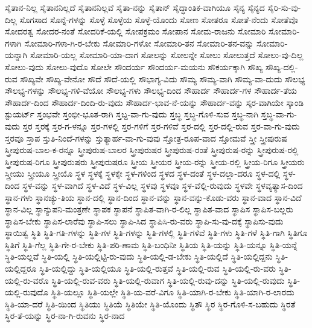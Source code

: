 {ಸೈತಾನ-ನಿಲ್ಲ
ಸೈತಾನನಿಲ್ಲದೆ
ಸೈತಾನನಿಲ್ಲವೆ
ಸೈತಾ-ನನ್ನು
ಸೈತಾನ್
ಸೈದ್ಧಾಂತಿಕ-ವಾಗಿಯೂ
ಸೈನ್ಯ
ಸೈನ್ಯದ
ಸೈರಿ-ಸು-ವು-ದಿಲ್ಲ
ಸೊಗಸಾದ
ಸೊನ್ನೆ-ಗಳನ್ನು
ಸೊಳ್ಳೆ
ಸೊಳ್ಳೆಯ
ಸೊಳ್ಳೆ-ಯೊಂದು
ಸೋಣ
ಸೋತರೂ
ಸೋತೆ-ನೆಂದು
ಸೋತೆವೊ
ಸೋದರತ್ವ
ಸೋದರ-ನಂತೆ
ಸೋದರಿಕೆ-ಯಲ್ಲಿ
ಸೋಪಕ್ರಮಂ
ಸೋಪಾನ
ಸೋಮ-ರಾಜನು
ಸೋಮಾರಿ
ಸೋಮಾರಿ-ಗಳಾಗಿ
ಸೋಮಾರಿ-ಗಳಾ-ಗಿ-ರ-ಬೇಕು
ಸೋಮಾರಿ-ಗಳೋ
ಸೋಮಾರಿ-ತನ
ಸೋಮಾರಿ-ತನ-ವನ್ನು
ಸೋಮಾರಿ-ಯನ್ನಾಗಿ
ಸೋಮಾರಿ-ಯಲ್ಲ
ಸೋಮಾರಿ-ಯಾ-ದಾಗ
ಸೋಲನ್ನು
ಸೋಲನ್ನೇ
ಸೋಲು
ಸೋಲುತ್ತದೆ
ಸೋಲು-ವು-ದಿಲ್ಲ
ಸೋಲು-ವುದು
ಸೋಲು-ವುದೊ
ಸೋಲೇ
ಸೌಂದರ್ಯ
ಸೌಂದರ್ಯ-ಮಯನು
ಸೌಕರ್ಯಕ್ಕಾಗಿ
ಸೌಖ್ಯ
ಸೌಖ್ಯ-ದಲ್ಲಿ-ರುವ
ಸೌಖ್ಯವೇ
ಸೌಖ್ಯ-ವೇನೋ
ಸೌದೆ
ಸೌದೆ-ಯಲ್ಲಿ
ಸೌಭಾಗ್ಯ-ವಿದು
ಸೌಮ್ಯ
ಸೌಮ್ಯ-ವಾಗಿ
ಸೌಮ್ಯ-ವಾ-ದುದು
ಸೌಲಭ್ಯ
ಸೌಲಭ್ಯ-ಗಳನ್ನು
ಸೌಲಭ್ಯ-ಗಳಿ-ವೆಯೋ
ಸೌಲಭ್ಯ-ಗಳು
ಸೌಲಭ್ಯ-ದಿಂದ
ಸೌಹಾರ್ದ
ಸೌಹಾರ್ದ-ಗಳ
ಸೌಹಾರ್ದ-ತೆಯ
ಸೌಹಾರ್ದ-ದಿಂದ
ಸೌಹಾರ್ದ-ದಿಂದಿ-ರು-ವುದು
ಸೌಹಾರ್ದ-ಭಾವ-ನೆ-ಯನ್ನು
ಸೌಹಾರ್ದ-ವನ್ನು
ಸ್ಕರ-ವಾಗಿಯೇ
ಸ್ಕಾಂಡಿ
ಸ್ಟುಯರ್ಟ್
ಸ್ತಂಭವೇ
ಸ್ತಂಭೀ-ಭೂತ-ರಾಗಿ
ಸ್ತಬ್ದ-ವಾ-ಗು-ವುದು
ಸ್ತಬ್ಧ
ಸ್ತಬ್ಧ-ಗೊಳಿ-ಸುವ
ಸ್ತಬ್ಧ-ನಾಗಿ
ಸ್ತಬ್ಧ-ವಾ-ಗು-ವುದು
ಸ್ತರ
ಸ್ತರಕ್ಕೆ
ಸ್ತರ-ಗ-ಳನ್ನೂ
ಸ್ತರ-ಗಳಲ್ಲಿ
ಸ್ತರ-ಗಳಿಗೆ
ಸ್ತರ-ಗಳಿವೆ
ಸ್ತರ-ದಲ್ಲಿ
ಸ್ತರ-ದಲ್ಲಿ-ರುವ
ಸ್ತರ-ವಾ-ಗು-ವುದು
ಸ್ತರವೂ
ಸ್ತಾಪ
ಸ್ತುತಿ-ನಿಂದೆ-ಗಳನ್ನು
ಸ್ತುತ್ಯಾರ್ಹ-ವಾ-ಗು-ವುವು
ಸ್ತೋತ್ರ-ರೂಪ-ವಾದ
ಸ್ತೋಮವೆ
ಸ್ತ್ರೀ
ಸ್ತ್ರೀಪುರುಷ
ಸ್ತ್ರೀಪುರುಷ-ಬಾಲ-ಕ-ರನ್ನೂ
ಸ್ತ್ರೀಪುರುಷ-ಬಾಲರ
ಸ್ತ್ರೀಪುರುಷರ
ಸ್ತ್ರೀಪುರುಷ-ರಂತೆ
ಸ್ತ್ರೀಪುರುಷ-ರನ್ನು
ಸ್ತ್ರೀಪುರುಷ-ರಲ್ಲಿ
ಸ್ತ್ರೀಪುರುಷ-ರಿಗೂ
ಸ್ತ್ರೀಪುರುಷರು
ಸ್ತ್ರೀಪುರುಷರೂ
ಸ್ತ್ರೀಯ
ಸ್ತ್ರೀಯರ
ಸ್ತ್ರೀಯ-ರನ್ನು
ಸ್ತ್ರೀಯ-ರಲ್ಲಿ
ಸ್ತ್ರೀಯ-ರಿಗೂ
ಸ್ತ್ರೀಯರು
ಸ್ತ್ರೀಯು
ಸ್ತ್ರೀಯೂ
ಸ್ತ್ರೀಯೊ
ಸ್ಥಳ
ಸ್ಥಳಕ್ಕೆ
ಸ್ಥಳಕ್ಕೇ
ಸ್ಥಳ-ಗಳಿಂದ
ಸ್ಥಳದ
ಸ್ಥಳ-ದಂತೆ
ಸ್ಥಳ-ದಲ್ಲಾ-ದರೂ
ಸ್ಥಳ-ದಲ್ಲಿ
ಸ್ಥಳ-ದಿಂದ
ಸ್ಥಳ-ವನ್ನು
ಸ್ಥಳ-ವಾಗಿದೆ
ಸ್ಥಳ-ವಿದೆ
ಸ್ಥಳ-ವಿಲ್ಲ
ಸ್ಥಳವು
ಸ್ಥಳವೂ
ಸ್ಥಳ-ವೆಲ್ಲಿ-ರುವುದು
ಸ್ಥಳವೇ
ಸ್ಥಳವ್ಯತ್ಯಾಸ-ದಿಂದ
ಸ್ಥಾನ-ಗಳು
ಸ್ಥಾನಚ್ಯು-ತಿಯ
ಸ್ಥಾನ-ದಲ್ಲಿ
ಸ್ಥಾನ-ದಿಂದ
ಸ್ಥಾನ-ವನ್ನು
ಸ್ಥಾನ-ವನ್ನು-ಕೊಡು-ವರು
ಸ್ಥಾನ-ವಾದ
ಸ್ಥಾನ-ವಿದೆ
ಸ್ಥಾನ-ವಿಲ್ಲ
ಸ್ಥಾನ್ಯುಪನಿ-ಮಂತ್ರಣೇ
ಸ್ಥಾಪಕ
ಸ್ಥಾಪನೆ
ಸ್ಥಾಪಿತ-ವಾಗಿ-ರ-ಲಿಲ್ಲ
ಸ್ಥಾಪಿತ-ವಾದ
ಸ್ಥಾಪಿಸ
ಸ್ಥಾಪಿಸ-ಬಲ್ಲರು
ಸ್ಥಾಪಿಸ-ಬೇಕು
ಸ್ಥಾಪಿಸ-ಲಾರೆವು
ಸ್ಥಾಪಿ-ಸಲು
ಸ್ಥಾಪಿ-ಸಿದ
ಸ್ಥಾಪಿಸಿ-ರು-ವರು
ಸ್ಥಾಪಿ-ಸು-ವು-ದಕ್ಕೆ
ಸ್ಥಾಪಿಸು-ವುದು
ಸ್ಥಾಯಿತ್ವ
ಸ್ಥಿತಿ
ಸ್ಥಿತಿ-ಗತಿ-ಗಳನ್ನು
ಸ್ಥಿತಿ-ಗಳ
ಸ್ಥಿತಿ-ಗಳನ್ನು
ಸ್ಥಿತಿ-ಗಳಲ್ಲಿ
ಸ್ಥಿತಿ-ಗಳಿವೆ
ಸ್ಥಿತಿ-ಗಳು
ಸ್ಥಿತಿ-ಗಳೆ
ಸ್ಥಿತಿ-ಗಾಗಿ
ಸ್ಥಿತಿಗೂ
ಸ್ಥಿತಿಗೆ
ಸ್ಥಿತಿ-ಗೆಲ್ಲ
ಸ್ಥಿತಿ-ಗೇ-ರ-ಬೇಕು
ಸ್ಥಿತಿ-ಪರಿ-ಣಾಮ
ಸ್ಥಿತಿ-ಬಂಧಿನೀ
ಸ್ಥಿತಿಯ
ಸ್ಥಿತಿ-ಯನ್ನು
ಸ್ಥಿತಿ-ಯನ್ನೂ
ಸ್ಥಿತಿ-ಯನ್ನೆ
ಸ್ಥಿತಿ-ಯಲ್ಲವೆ
ಸ್ಥಿತಿ-ಯಲ್ಲಿ
ಸ್ಥಿತಿ-ಯಲ್ಲಿಟ್ಟಿ-ರು-ವುದು
ಸ್ಥಿತಿ-ಯಲ್ಲಿ-ಡ-ಬೇಕು
ಸ್ಥಿತಿ-ಯಲ್ಲಿದೆ
ಸ್ಥಿತಿ-ಯಲ್ಲಿದ್ದನು
ಸ್ಥಿತಿ-ಯಲ್ಲಿದ್ದರೂ
ಸ್ಥಿತಿ-ಯಲ್ಲಿದ್ದು
ಸ್ಥಿತಿ-ಯಲ್ಲಿಯೂ
ಸ್ಥಿತಿ-ಯಲ್ಲಿ-ರುತ್ತವೆ
ಸ್ಥಿತಿ-ಯಲ್ಲಿ-ರುವ
ಸ್ಥಿತಿ-ಯಲ್ಲಿ-ರು-ವರು
ಸ್ಥಿತಿ-ಯಲ್ಲಿ-ರು-ವರೊ
ಸ್ಥಿತಿ-ಯಲ್ಲಿ-ರುವ-ವರು
ಸ್ಥಿತಿ-ಯಲ್ಲಿ-ರುವಾಗ
ಸ್ಥಿತಿ-ಯಲ್ಲಿ-ರುವು-ದನ್ನು
ಸ್ಥಿತಿ-ಯಲ್ಲಿ-ರುವುದು
ಸ್ಥಿತಿ-ಯಲ್ಲಿ-ರುವುದೊ
ಸ್ಥಿತಿ-ಯಲ್ಲೂ
ಸ್ಥಿತಿ-ಯಲ್ಲೇ
ಸ್ಥಿತಿ-ಯ-ವರೆ-ವಿಗೂ
ಸ್ಥಿತಿ-ಯಾಗಿ-ರ-ಬೇಕು
ಸ್ಥಿತಿ-ಯಾಗಿ-ರ-ಲಾರದು
ಸ್ಥಿತಿ-ಯಾ-ದರೆ
ಸ್ಥಿತಿ-ಯಿಂದ
ಸ್ಥಿತಿಯು
ಸ್ಥಿತಿಯೆ
ಸ್ಥಿತಿಯೇ
ಸ್ಥಿತಿ-ಯೊಂದು
ಸ್ಥಿತೌ
ಸ್ಥಿರ
ಸ್ಥಿರ-ಗೊಳಿ-ಸ-ಬಹುದು
ಸ್ಥಿರತೆ
ಸ್ಥಿರ-ತೆ-ಯನ್ನು
ಸ್ಥಿರ-ನಾ-ಗಿ-ರುವನು
ಸ್ಥಿರ-ನಾದ
}
